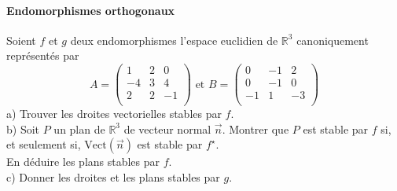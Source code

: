 \documentclass[a4paper,10pt]{article}
\begin{document}
\paragraph{Endomorphismes orthogonaux}
Soient $f$ et $g$ deux endomorphismes l'espace euclidien de $\mathbb{R}^3 $
canoniquement représentés par
$$A = \left( {
\begin{array}{ccc}
 1 & 2 & 0  \\
 { - 4} & 3 & 4  \\
 2 & 2 & { - 1}  \\
\end{array}
} \right)\text{ et }B = \left( {
\begin{array}{ccc}
 0 & { - 1} & 2  \\
 0 & { - 1} & 0  \\
 { - 1} & 1 & { - 3}  \\
\end{array}
} \right)$$
a) Trouver les droites vectorielles stables par $f$.\\
b) Soit $P$ un plan de $\mathbb{R}^3 $ de vecteur normal $\vec{n}$. Montrer que
$P$ est stable par $f$ si, et seulement si, $\textrm{Vect} (\vec{n})$ est stable
par $f^\star  $.\\
En déduire les plans stables par $f$.\\
c) Donner les droites et les plans stables par $g$.
\end{document}
